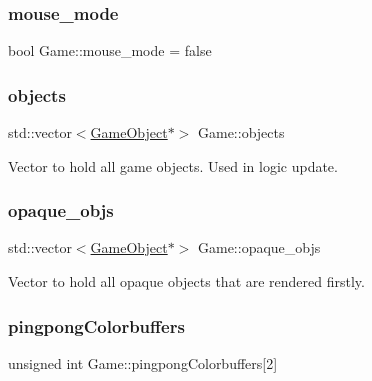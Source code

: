 \mbox{\label{class_game_a2ba304fc1c700d96594813ea8be1fab4}} 
\subsubsection{\texorpdfstring{mouse\_mode}{mouse\_mode}}
{\footnotesize\ttfamily bool Game\+::mouse\+\_\+mode = false}

\mbox{\label{class_game_ac025aa21d226a5beb9ba19bc418af894}} 
\subsubsection{\texorpdfstring{objects}{objects}}
{\footnotesize\ttfamily std\+::vector$<$\mbox{\hyperlink{class_game_object}{Game\+Object}}$\ast$$>$ Game\+::objects}



Vector to hold all game objects. Used in logic update. 

\mbox{\label{class_game_affc1bb149ae6c474261ba1bfe133af07}} 
\subsubsection{\texorpdfstring{opaque\_objs}{opaque\_objs}}
{\footnotesize\ttfamily std\+::vector$<$\mbox{\hyperlink{class_game_object}{Game\+Object}}$\ast$$>$ Game\+::opaque\+\_\+objs}



Vector to hold all opaque objects that are rendered firstly. 

\mbox{\label{class_game_abbb66ef5bda6124f03272970cd18707f}} 
\subsubsection{\texorpdfstring{pingpongColorbuffers}{pingpongColorbuffers}}
{\footnotesize\ttfamily unsigned int Game\+::pingpong\+Colorbuffers\mbox{[}2\mbox{]}\hspace{0.3cm}{\ttfamily [protected]}}



